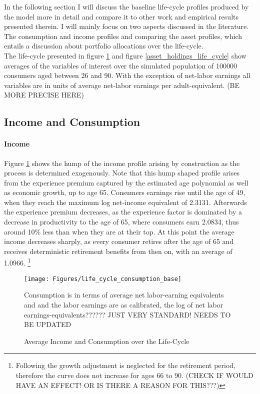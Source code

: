 \documentclass[a4paper,12pt]{article}
\begin{document}
In the following section I will discuss the baseline life-cycle profiles produced by the model more in detail and compare it to other work and empirical results presented therein. I will mainly focus on two aspects discussed in the literature. The consumption and income profiles and comparing the asset profiles, which entails a discussion about portfolio allocations over the life-cycle. \\
The life-cycle presented in figure \ref{consumption_life_cycle} and figure \ref{asset_holdings_life_cycle} show averages of the variables of interest over the simulated population of 100000 consumers aged between 26 and 90. With the exception of net-labor earnings all variables are in units of average net-labor earnings per adult-equivalent. (BE MORE PRECISE HERE) 

\subsection{Income and Consumption}

\paragraph{Income} Figure \ref{consumption_life_cycle} shows the hump of the income profile arising by construction as the process is determined exogenously. Note that this hump shaped profile arises from the experience premium captured by the estimated age polynomial as well as economic growth, up to age 65. Consumers earnings rise until the age of 49, when they reach the maximum log net-income equivalent of 2.3131. Afterwards the experience premium decreases, as the experience factor is dominated by a decrease in productivity to the age of 65, where consumers earn 2.0834, thus around 10\% less than when they are at their top. At this point the average income decreases sharply, as every consumer retires after the age of 65 and receives deterministic retirement benefits from then on, with an average of 1.0966. \footnote{Following \cite{hintermaier2011} the growth adjustment is neglected for the retirement period, therefore the curve does not increase for ages 66 to 90. (CHECK IF WOULD HAVE AN EFFECT! OR IS THERE A REASON FOR THIS???)} 

\begin{figure}[!htbp]
\caption{Average Income and Consumption over the Life-Cycle} 
\label{consumption_life_cycle}	%
\centering
\texttt{[image: Figures/life\_cycle\_consumption\_base]}  %

\begin{minipage}{0.8\linewidth}
\footnotesize{Consumption is in terms of average net labor-earning equivalents and and the labor earnings are as calibrated, the log of net labor earnings-equivalents?????? JUST VERY STANDARD! NEEDS TO BE UPDATED}
\end{minipage}

\end{figure}
\end{document}

